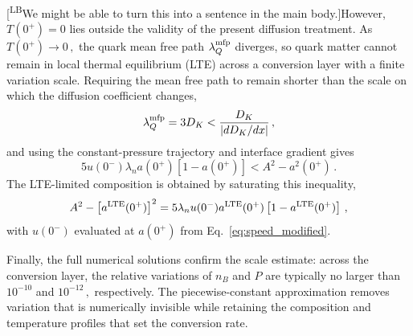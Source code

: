 \documentclass[10pt,superscriptaddress,
amsmath,aps,prc,twocolumn,nofootinbib,floatfix]{revtex4-1}
\newcommand{\LBcom}[1]{\textsf{\color{blue}[\textsuperscript{LB}#1]}}
\newcommand{\Bratio}{\lambda_n}
\begin{document}
\LBcom{We might be able to turn this into a sentence in the main body.}However, $T(0^+)=0$ lies outside the validity of the present diffusion treatment.
As $T(0^+)\to0\,,$ the quark mean free path $\lambda^{\rm mfp}_Q$ diverges, so quark matter cannot remain in local thermal equilibrium (LTE) across a conversion layer with a finite variation scale.
Requiring the mean free path to remain shorter than the scale on which the diffusion coefficient changes,
\begin{equation}
 \lambda^{\rm mfp}_Q=3D_K
 <
 \frac{D_K}{|dD_K/dx|}\,,
\label{eq:LTE_condition}
\end{equation}
and using the constant-pressure trajectory and interface gradient gives
\begin{equation}
 5u(0^-)\Bratio a(0^+)[1-a(0^+)]
 < A^2-a^2(0^+)\,.
\label{eq:LTE_inequality}
\end{equation}
The LTE-limited composition is obtained by saturating this inequality,
\begin{equation}
 A^2-\left[a^{\rm LTE}(0^+)\right]^2
 =
 5\Bratio u(0^-)a^{\rm LTE}(0^+)
 \left[1-a^{\rm LTE}(0^+)\right]\,,
\label{eq:LTE_cutoff}
\end{equation}
with $u(0^-)$ evaluated at $a(0^+)$ from
Eq.~\eqref{eq:speed_modified}.

Finally, the full numerical solutions confirm the scale estimate: across the conversion layer, the relative variations of $n_B$ and $P$ are typically no larger than $10^{-10}$ and $10^{-12}\,,$ respectively.  
The piecewise-constant approximation removes variation that is numerically invisible while retaining the composition and temperature profiles that set the conversion rate.

\end{document}
